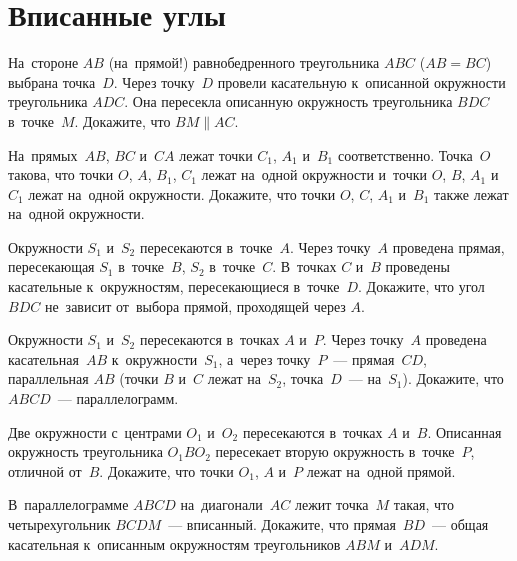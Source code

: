 
\section*{Вписанные углы}


\begin{problems}

\item
На~стороне $AB$ (на~прямой!) равнобедренного треугольника $ABC$ ($AB = BC$)
выбрана точка~$D$.
Через точку~$D$ провели касательную к~описанной окружности треугольника $ADC$.
Она пересекла описанную окружность треугольника $BDC$ в~точке~$M$.
Докажите, что $BM \parallel AC$.

\item
На~прямых~$AB$, $BC$ и~$CA$ лежат точки $C_1$, $A_1$ и~$B_1$ соответственно.
Точка~$O$ такова, что точки $O$, $A$, $B_1$, $C_1$ лежат на~одной окружности
и~точки $O$, $B$, $A_1$ и~$C_1$ лежат на~одной окружности.
Докажите, что точки $O$, $C$, $A_1$ и~$B_1$ также лежат на~одной окружности.

\item
Окружности $S_1$ и~$S_2$ пересекаются в~точке~$A$.
Через точку~$A$ проведена прямая, пересекающая $S_1$ в~точке~$B$, $S_2$
в~точке~$C$.
В~точках $C$ и~$B$ проведены касательные к~окружностям, пересекающиеся
в~точке~$D$.
Докажите, что угол $BDC$ не~зависит от~выбора прямой, проходящей через $A$.

\item
Окружности $S_1$ и~$S_2$ пересекаются в~точках $A$ и~$P$.
Через точку~$A$ проведена касательная~$AB$ к~окружности~$S_1$, а~через
точку~$P$~--- прямая~$CD$, параллельная $AB$
(точки $B$ и~$C$ лежат на~$S_2$, точка~$D$~--- на~$S_1$).
Докажите, что $ABCD$~--- параллелограмм.

\item
Две окружности с~центрами $O_1$ и~$O_2$ пересекаются в~точках $A$ и~$B$.
Описанная окружность треугольника $O_1 B O_2$ пересекает вторую окружность
в~точке~$P$, отличной от~$B$.
Докажите, что точки $O_1$, $A$ и~$P$ лежат на~одной прямой.

\item
В~параллелограмме $ABCD$ на~диагонали~$AC$ лежит точка~$M$ такая, что
четырехугольник $BCDM$~--- вписанный.
Докажите, что прямая~$BD$~--- общая касательная к~описанным окружностям
треугольников $ABM$ и~$ADM$.


\end{problems}
